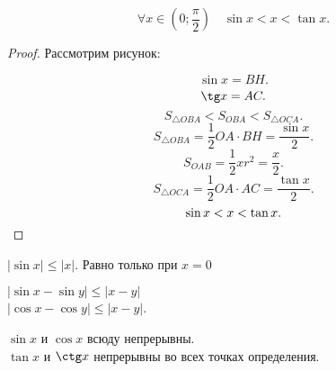 \documentclass[11pt, oneside]{article}   	%
\begin{document}
    \begin{theorem}
        \[ \forall{x\in \left( 0; \frac{\pi}{2} \right) }\quad \sin x < x < \tan x .\] 
        \begin{proof}
            Рассмотрим рисунок:\\
           \begin{center}
           \end{center}
           \[ \sin x = BH .\]
           \[ \tg x = AC .\]
           \[ S_{\triangle OBA} < S_{OBA} < S_{\triangle OCA} .\]
           \[ S_{\triangle OBA} = \frac{1}{2}OA\cdot BH = \frac{\sin x}{2} .\]
           \[ S_{OAB} = \frac{1}{2}xr^2 = \frac{x}{2} .\]
           \[ S_{\triangle OCA} = \frac{1}{2} OA\cdot AC = \frac{\tan x}{2} .\]
           \[\sin x < x < \tan x .\qedhere\] 
        \end{proof}
    \end{theorem}
    \begin{tlemma}
        $|\sin x| \le |x|$. Равно только при $x=0$
    \end{tlemma}
    \begin{tlemma}
        $|\sin x - \sin y| \le |x-y|$\\
        $|\cos x - \cos y| \le |x-y|$.
    \end{tlemma}
    \begin{tlemma}
        $\sin x$ и $\cos x$ всюду непрерывны.\\
        $\tan x$ и $\ctg x$ непрерывны во всех точках определения.
    \end{tlemma}
\end{document}
